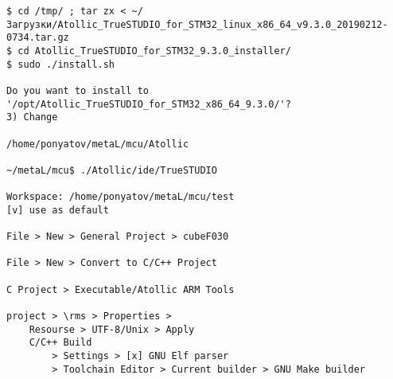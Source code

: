 \begin{lstlisting}
$ cd /tmp/ ; tar zx < ~/Загрузки/Atollic_TrueSTUDIO_for_STM32_linux_x86_64_v9.3.0_20190212-0734.tar.gz
$ cd Atollic_TrueSTUDIO_for_STM32_9.3.0_installer/
$ sudo ./install.sh

Do you want to install to '/opt/Atollic_TrueSTUDIO_for_STM32_x86_64_9.3.0/'?
3) Change

/home/ponyatov/metaL/mcu/Atollic

~/metaL/mcu$ ./Atollic/ide/TrueSTUDIO

Workspace: /home/ponyatov/metaL/mcu/test
[v] use as default

File > New > General Project > cubeF030

File > New > Convert to C/C++ Project

C Project > Executable/Atollic ARM Tools

project > \rms > Properties > 
	Resourse > UTF-8/Unix > Apply
	C/C++ Build
		> Settings > [x] GNU Elf parser
		> Toolchain Editor > Current builder > GNU Make builder

\end{lstlisting}

\secup
